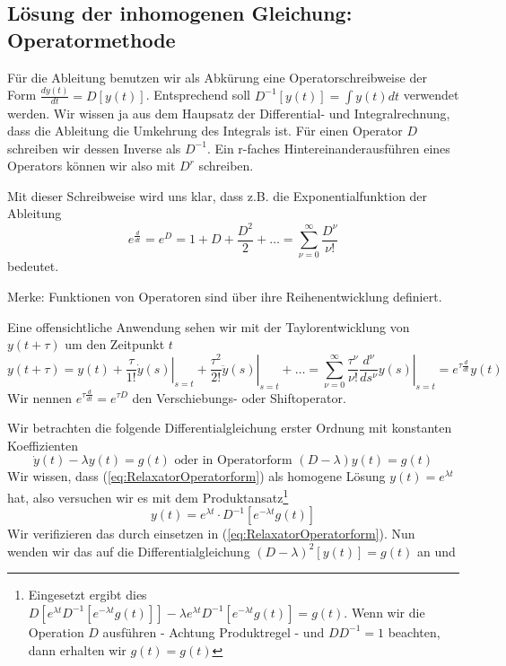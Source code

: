\subsection{Lösung der inhomogenen Gleichung: Operatormethode}
Für die Ableitung benutzen wir als Abkürung eine Operatorschreibweise der Form
$\frac{dy(t)}{dt}=D[y(t)]$. Entsprechend soll $D^{-1}[y(t)]=\int y(t)dt$
verwendet werden. Wir wissen ja aus dem Haupsatz der Differential- und
Integralrechnung, dass die Ableitung die Umkehrung des Integrals ist. Für einen
Operator $D$ schreiben wir dessen Inverse als $D^{-1}$. Ein r-faches
Hintereinanderausführen eines Operators können wir also mit $D^r$ schreiben.
\begin{note}{}
  Mit dieser Schreibweise wird uns klar, dass z.B. die Exponentialfunktion der
  Ableitung
  \[e^\frac{d}{dt}=e^D=1+D+\frac{D^2}{2}+\dots=\sum_{\nu=0}^\infty\frac{D^\nu}{\nu!}\]
  bedeutet. 
  
  Merke: Funktionen von Operatoren sind über ihre Reihenentwicklung
  definiert.

  Eine offensichtliche Anwendung sehen wir mit der Taylorentwicklung von
  $y(t+\tau)$ um den Zeitpunkt $t$
  \[y(t+\tau)=y(t)+\left.\frac{\tau}{1!}\dot{y}(s)\right|_{s=t}+\left.\frac{\tau^2}{2!}\ddot{y}(s)\right|_{s=t}
	+\dots=\sum\limits_{\nu=0}^{\infty}\left.\frac{\tau^\nu}{\nu!}\frac{d^\nu}{ds^\nu}y(s)\right|_{s=t}=
	e^{\tau\frac{d}{dt}}y(t)\]
  Wir nennen $e^{\tau\frac{d}{dt}}=e^{\tau D}$ den Verschiebungs- oder
  Shiftoperator.
\end{note}
Wir betrachten die folgende Differentialgleichung erster Ordnung mit konstanten
Koeffizienten 
\begin{equation}
  \dot{y}(t)-\lambda y(t)=g(t)\mbox{ oder in Operatorform }(D-\lambda)y(t)=g(t)
  \label{eq:RelaxatorOperatorform}
\end{equation}
Wir wissen, dass (\ref{eq:RelaxatorOperatorform}) als homogene Lösung
$y(t)=e^{\lambda t}$ hat, also versuchen wir es mit dem
Produktansatz\footnote[1]{Eingesetzt ergibt dies $D[e^{\lambda
t}D^{-1}[e^{-\lambda t}g(t)]]-\lambda e^{\lambda t}D^{-1}[e^{-\lambda
t}g(t)]=g(t)$. Wenn wir die Operation $D$ ausführen - Achtung Produktregel -
und $DD^{-1}=1$ beachten, dann erhalten wir $g(t)=g(t)$}
\begin{equation}
  y(t)=e^{\lambda t}\cdot D^{-1}[e^{-\lambda t}g(t)]
  \label{eq:Produktansatz}
\end{equation}
Wir verifizieren das durch einsetzen in (\ref{eq:RelaxatorOperatorform}). Nun
wenden wir das auf die Differentialgleichung $(D-\lambda)^2[y(t)]=g(t)$ an und

